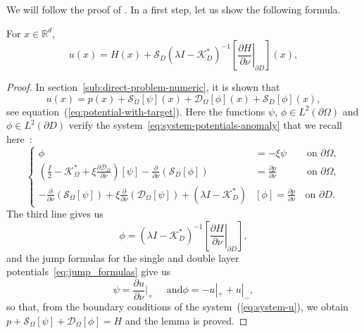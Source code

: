 We will follow the proof of \cite[Theorem 4.8]{ammari2004reconstruction}. In a first
step, let us show the following formula.
\begin{lemma}
For $x\in\mathbb{R}^{d}$,
\begin{equation}
u(x)=H(x)+\mathcal{S}_{D}(\lambda
I-\mathcal{K}_{D}^{*})^{-1}\left[\left.\frac{\partial
H}{\partial\nu}\right|_{\partial D}\right](x),\label{eq:u-H}
\end{equation}
\end{lemma}
\begin{proof}
In section~\ref{sub:direct-problem-numeric}, it is shown that
\[
u(x)=p(x)+\mathcal{S}_{\Omega}[\psi](x)+\mathcal{D}_{\Omega}[\phi](x)+\mathcal{S}_{D}[\phi](x),
\]
see equation~(\ref{eq:potential-with-target}). Here the functions $\psi$, $\phi\in L^{2}(\partial\Omega)$ and
$\phi\in L^{2}(\partial D)$ verify the system~\eqref{eq:system-potentials-anomaly} that
we recall here~:
\[
\left\{ \begin{alignedat}{2}\phi & =-\xi\psi & \,\, \mbox{on } \partial\Omega,\\
\left(\frac{I}{2}-\mathcal{K}_{\Omega}^{*}+\xi\frac{\partial\mathcal{D}_{\Omega}}{\partial\nu}\right)[\psi]
-\frac{\partial}{\partial\nu}(\mathcal{S}_{D}[\phi]) & =\frac{\partial p}{\partial\nu} & \,\, \mbox{on } \partial\Omega,\\
-\frac{\partial}{\partial\nu}(\mathcal{S}_{\Omega}[\psi])+\xi\frac{\partial}{\partial\nu}(\mathcal{D}_{\Omega}[\psi])
+(\lambda I-\mathcal{K}_{D}^{*}) & [\phi]=\frac{\partial
p}{\partial\nu} & \,\mbox{on } \partial D.
\end{alignedat}
\right.
\]
The third line gives us
\[
\phi=(\lambda
I-\mathcal{K}_{D}^{*})^{-1}\left[\left.\frac{\partial
H}{\partial\nu}\right|_{\partial D}\right],
\]
and the jump formulas for the single and double layer
potentials~\eqref{eq:jump_formulas} give us
\[
\psi= \frac{\partial u}{\partial\nu} \bigg|_+ \quad \mbox{ and
}\phi=- u|_+ + u|_-,
\]
so that, from the boundary conditions of the
system~(\ref{eq:system-u}), we obtain
$p+\mathcal{S}_{\Omega}[\psi]+\mathcal{D}_{\Omega}[\phi]=H$ and
the lemma is proved.
\end{proof}


